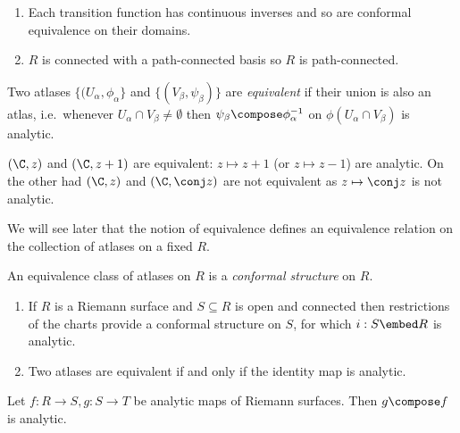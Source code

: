 \documentclass[a4paper]{article}
\begin{document}
\begin{remark}\leavevmode
  \begin{enumerate}
  \item Each transition function has continuous inverses and so are conformal equivalence on their domains.
  \item \(R\) is connected with a path-connected basis so \(R\) is path-connected.
  \end{enumerate}
\end{remark}

\begin{definition}
  Two atlases \(\{(U_\alpha, \phi_\alpha\}\) and \(\{(V_\beta, \psi_\beta)\}\) are \emph{equivalent} if their union is also an atlas, i.e.\ whenever \(U_\alpha \cap V_\beta \neq \emptyset\) then \(\psi_\beta \compose \phi_\alpha^{-1}\) on \(\phi(U_\alpha \cap V_\beta)\) is analytic.
\end{definition}

\begin{eg}
  \((\C, z)\) and \((\C, z + 1)\) are equivalent: \(z \mapsto z + 1\) (or \(z \mapsto z - 1\)) are analytic. On the other had \((\C, z)\) and \((\C, \conj z)\) are not equivalent as \(z \mapsto \conj z\) is not analytic.
\end{eg}

We will see later that the notion of equivalence defines an equivalence relation on the collection of atlases on a fixed \(R\).

\begin{definition}
  An equivalence class of atlases on \(R\) is a \emph{conformal structure} on \(R\).
\end{definition}

\begin{remark}\leavevmode
  \begin{enumerate}
  \item If \(R\) is a Riemann surface and \(S \subseteq R\) is open and connected then restrictions of the charts provide a conformal structure on \(S\), for which \(i: S \embed R\) is analytic.
  \item Two atlases are equivalent if and only if the identity map is analytic.
  \end{enumerate}
\end{remark}

\begin{proposition}
  Let \(f: R \to S, g: S \to T\) be analytic maps of Riemann surfaces. Then \(g \compose f\) is analytic.
\end{proposition}
\end{document}
